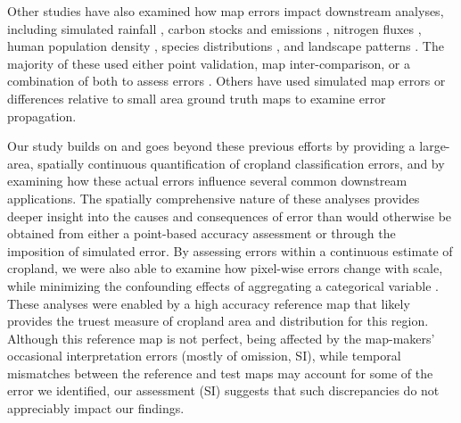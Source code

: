 \documentclass[12 pt, titlepage, a4paper]{article}
\begin{document}
Other studies have also examined how map errors impact downstream analyses, including simulated rainfall \citep{ge_impacts_2007}, carbon stocks and emissions \citep{goetz_mapping_2009, quaife_impact_2008, olofsson_making_2013,jain_co2_2013}, nitrogen fluxes \citep{jain_co2_2013,nol_effect_2008}, human population density \citep{linard_assessing_2010}, species distributions \citep{tuanmu_global_2014}, and landscape patterns \citep{langford_map_2006}. The majority of these used either point validation, map inter-comparison, or a combination of both to assess errors \citep{goetz_mapping_2009, olofsson_making_2013, jain_co2_2013, linard_assessing_2010, quaife_impact_2008,tuanmu_global_2014}. Others have used simulated map errors \citep{ge_impacts_2007,langford_map_2006} or differences relative to small area ground truth maps \citep[$<$1000 m;][]{nol_effect_2008} to examine error propagation.

Our study builds on and goes beyond these previous efforts by providing a large-area, spatially continuous quantification of cropland classification errors, and by examining how these actual errors influence several common downstream applications. The spatially comprehensive nature of these analyses provides deeper insight into the causes and consequences of error than would otherwise be obtained from either a point-based accuracy assessment or through the imposition of simulated error. By assessing errors within a continuous estimate of cropland, we were also able to examine how pixel-wise errors change with scale, while minimizing the confounding effects of aggregating a categorical variable \citep[][and see discussion in subsequent Recommendations section]{moody_influence_1995, marceau_remote_1999}. These analyses were enabled by a high accuracy reference map that likely provides the truest measure of cropland area and distribution for this region. Although this reference map is not perfect, being affected by the map-makers' occasional interpretation errors (mostly of omission, SI), while temporal mismatches between the reference and test maps may account for some of the error we identified, our assessment (SI) suggests that such discrepancies do not appreciably impact our findings. 

\vspace{-0.3 cm} 
\end{document}
